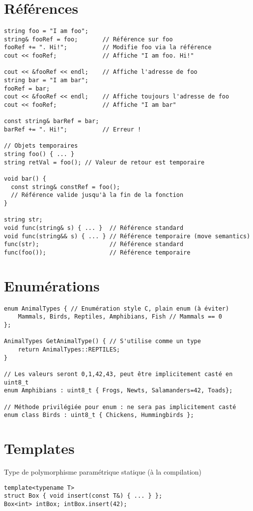 \documentclass{article}
\begin{document}
\begin{multicols*}{3}
\section*{Références}

\begin{lstlisting}
string foo = "I am foo";
string& fooRef = foo;       // Référence sur foo
fooRef += ". Hi!";          // Modifie foo via la référence
cout << fooRef;             // Affiche "I am foo. Hi!"

cout << &fooRef << endl;    // Affiche l'adresse de foo
string bar = "I am bar";
fooRef = bar;
cout << &fooRef << endl;    // Affiche toujours l'adresse de foo
cout << fooRef;             // Affiche "I am bar"

const string& barRef = bar;
barRef += ". Hi!";          // Erreur !

// Objets temporaires
string foo() { ... }
string retVal = foo(); // Valeur de retour est temporaire

void bar() {
  const string& constRef = foo();
  // Référence valide jusqu'à la fin de la fonction
}

string str;
void func(string& s) { ... }  // Référence standard
void func(string&& s) { ... } // Référence temporaire (move semantics)
func(str);                    // Référence standard
func(foo());                  // Référence temporaire

\end{lstlisting}

\section*{Enumérations}

\begin{lstlisting}
enum AnimalTypes { // Enumération style C, plain enum (à éviter)
    Mammals, Birds, Reptiles, Amphibians, Fish // Mammals == 0
};

AnimalTypes GetAnimalType() { // S'utilise comme un type
    return AnimalTypes::REPTILES;
}

// Les valeurs seront 0,1,42,43, peut être implicitement casté en uint8_t
enum Amphibians : uint8_t { Frogs, Newts, Salamanders=42, Toads};

// Méthode privilégiée pour enum : ne sera pas implicitement casté
enum class Birds : uint8_t { Chickens, Hummingbirds };
\end{lstlisting}

\section*{Templates}
Type de polymorphisme paramétrique statique (à la compilation)
\begin{lstlisting}
template<typename T>
struct Box { void insert(const T&) { ... } };
Box<int> intBox; intBox.insert(42);


\end{lstlisting}
\end{multicols*}
\end{document}
